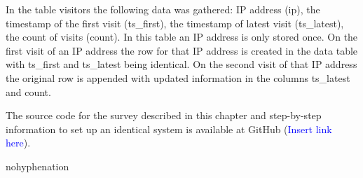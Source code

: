 In the table visitors the following data was gathered: IP address (ip), the timestamp of the first visit (ts\_first), the timestamp of latest visit (ts\_latest), the count of visits (count). In this table an IP address is only stored once. On the first visit of an IP address the row for that IP address is created in the data table with ts\_first and ts\_latest being identical. On the second visit of that IP address the original row is appended with updated information in the columns ts\_latest and count.

The source code for the survey described in this chapter and step-by-step information to set up an identical system is available at GitHub (\textcolor{blue}{Insert link here}).

\begin{hyphenrules}{nohyphenation}
    \begin{table}[ht]
        \centering
        \setlength\tabcolsep{1pt}
        \caption{Records} \label{tab:recordstab}
    \end{table} 
\end{hyphenrules}

